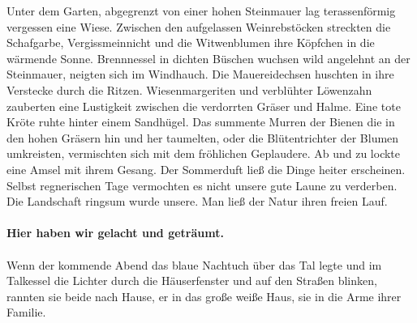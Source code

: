 Unter dem Garten, abgegrenzt von einer hohen Steinmauer lag terassenförmig vergessen eine Wiese. Zwischen den aufgelassen Weinrebstöcken streckten die Schafgarbe, Vergissmeinnicht und die Witwenblumen ihre Köpfchen in die wärmende Sonne. Brennnessel in dichten Büschen wuchsen wild angelehnt an der Steinmauer, neigten sich im Windhauch. Die Mauereidechsen huschten in ihre Verstecke durch die Ritzen. Wiesenmargeriten und verblühter Löwenzahn zauberten eine Lustigkeit zwischen die verdorrten Gräser und Halme. Eine tote Kröte ruhte hinter einem Sandhügel. Das summente Murren der Bienen die in den hohen Gräsern hin und her taumelten, oder die Blütentrichter der Blumen umkreisten, vermischten sich mit dem fröhlichen Geplaudere. Ab und zu lockte eine Amsel mit ihrem Gesang. Der Sommerduft ließ die Dinge heiter erscheinen. Selbst regnerischen Tage vermochten es nicht unsere gute Laune zu verderben. Die Landschaft ringsum wurde unsere. Man ließ der Natur ihren freien Lauf.\\\\
\textbf{Hier haben wir gelacht und geträumt.}\\\\

Wenn der kommende Abend das blaue Nachtuch über das Tal legte und im Talkessel die Lichter durch die Häuserfenster und auf den Straßen blinken, rannten sie beide nach Hause, er in das große weiße Haus, sie in die Arme ihrer Familie. 